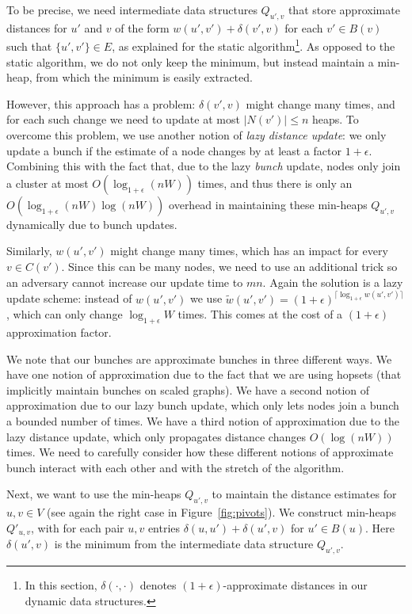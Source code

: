 \documentclass[11pt]{article}
\theoremstyle{definition}
\theoremstyle{remark}
\begin{document}
\begin{titlepage}
To be precise, we need intermediate data structures $Q_{u',v}$ that store approximate distances for $u'$ and $v$ of the form $w(u',v')+\delta(v',v)$ for each $v'\in B(v)$ such that $\{u',v'\}\in E$, as explained for the static algorithm\footnote{In this section, $\delta(\cdot,\cdot)$ denotes $(1+\epsilon)$-approximate distances in our dynamic data structures.}. As opposed to the static algorithm, we do not only keep the minimum, but instead maintain a min-heap, from which the minimum is easily extracted. 

However, this approach has a problem: $\delta(v',v)$ might change many times, and for each such change we need to update at most $|N(v')|\leq n$ heaps. To overcome this problem, we use another notion of \textit{lazy distance update}: we only update a bunch if the estimate of a node changes by at least a factor $1+\epsilon$. Combining this with the fact that, due to the lazy \textit{bunch} update, nodes only join a cluster at most $O(\log_{1+\epsilon}(nW))$ times, and thus there is only an $ O(\log_{1+\epsilon}(nW)\log(nW))$ overhead in maintaining these min-heaps $Q_{u',v}$ dynamically due to bunch updates. 

Similarly, $w(u',v')$ might change many times, which has an impact for every $v\in C(v')$. Since this can be many nodes, we need to use an additional trick so an adversary cannot increase our update time to $mn$. Again the solution is a lazy update scheme: instead of $w(u',v')$ we use $\tilde w(u', v')=(1+\epsilon)^{\lceil \log_{1+\epsilon} w(u',v')\rceil}$, which can only change $\log_{1+\epsilon} W$ times. This comes at the cost of a $(1+\epsilon)$ approximation factor. 


We note that our bunches are approximate bunches in three different ways. We have one notion of approximation due to the fact that we are using hopsets (that implicitly maintain bunches on scaled graphs). We have a second notion of approximation due to our lazy bunch update, which only lets nodes join a bunch a bounded number of times. We have a third notion of approximation due to the lazy distance update, which only propagates distance changes $O(\log(nW))$ times. We need to carefully consider how these different notions of approximate bunch interact with each other and with the stretch of the algorithm.

Next, we want to use the min-heaps $Q_{u',v}$ to maintain the distance estimates for $u,v\in V$ (see again the right case in Figure~\ref{fig:pivots}). We construct min-heaps $Q'_{u,v}$, with for each pair $u,v$ entries $\delta(u,u')+\delta(u',v)$ for $u' \in B(u)$. Here $\delta(u',v)$ is the minimum from the intermediate data structure $Q_{u',v}$. 


\end{titlepage}
\end{document}
